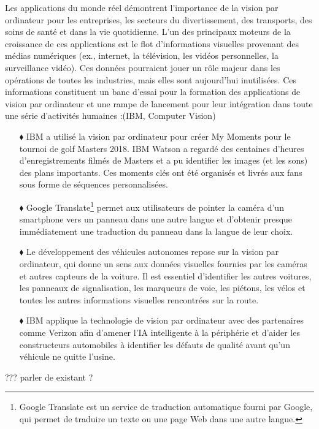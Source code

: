 		Les applications du monde réel démontrent l'importance de la vision par ordinateur pour les entreprises, les secteurs du divertissement, des transports, des soins de santé et dans la vie quotidienne. L'un des principaux moteurs de la croissance de ces applications est le flot d'informations visuelles provenant des médias numériques (ex., internet, la télévision, les vidéos personnelles, la surveillance vidéo).
		Ces données pourraient jouer un rôle majeur dans les opérations de toutes les industries, mais elles sont aujourd'hui inutilisées. Ces informations constituent un banc d'essai pour la formation des applications de vision par ordinateur et une rampe de lancement pour leur intégration dans toute une série d'activités humaines :(IBM, Computer Vision)
		
		\begin{itemize}
			\item[$\blacklozenge$] IBM a utilisé la vision par ordinateur pour créer My Moments pour le tournoi de golf Masters 2018. IBM Watson a regardé des centaines d'heures d'enregistrements filmés de Masters et a pu identifier les images (et les sons) des plans importants. Ces moments clés ont été organisés et livrés aux fans sous forme de séquences personnalisées.
			\item[$\blacklozenge$] Google Translate\footnote{Google Translate est un service de traduction automatique fourni par Google, qui permet de traduire un texte ou une page Web dans une autre langue.} permet aux utilisateurs de pointer la caméra d'un smartphone vers un panneau dans une autre langue et d'obtenir presque immédiatement une traduction du panneau dans la langue de leur choix.
			\item[$\blacklozenge$] Le développement des véhicules autonomes repose sur la vision par ordinateur, qui donne un sens aux données visuelles fournies par les caméras et autres capteurs de la voiture. Il est essentiel d'identifier les autres voitures, les panneaux de signalisation, les marqueurs de voie, les piétons, les vélos et toutes les autres informations visuelles rencontrées sur la route.
			\item[$\blacklozenge$] IBM applique la technologie de vision par ordinateur avec des partenaires comme Verizon afin d'amener l'IA intelligente à la périphérie et d'aider les constructeurs automobiles à identifier les défauts de qualité avant qu'un véhicule ne quitte l'usine.
		\end{itemize}
		
		??? parler de existant ?
		
